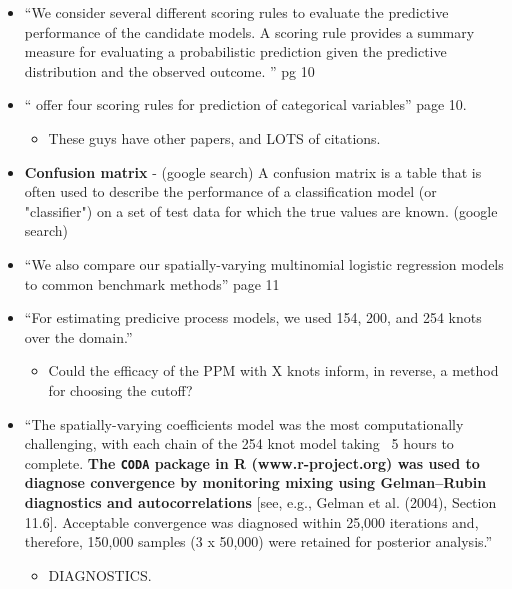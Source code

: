 \documentclass{article}
\begin{document}
\begin{itemize}
\begin{itemize}
    \end{itemize}
\item ``We consider several different scoring rules to evaluate the predictive performance of the candidate models. A scoring rule provides a summary measure for evaluating a probabilistic prediction given the predictive distribution and the observed outcome. '' pg 10
\item ``\cite{Gneiting2007} offer four scoring rules for prediction of categorical variables'' page 10. 
  \begin{itemize}
  \item These guys have other papers, and LOTS of citations.
  \end{itemize}
\item {\bf Confusion matrix} - (google search) A confusion matrix is a table that is often used to describe the performance of a classification model (or "classifier") on a set of test data for which the true values are known. (google search)
\item ``We also compare our spatially-varying multinomial logistic regression models to common benchmark methods'' page 11
\item ``For estimating predicive process models, we used 154, 200, and 254 knots over the domain.''
  \begin{itemize}
  \item Could the efficacy of the PPM with X knots inform, in reverse, a method for choosing the cutoff?
  \end{itemize}
\item ``The spatially-varying coefficients model was the most computationally challenging, with each chain of the 254 knot model taking ~5 hours to complete. {\bf The \verb|CODA| package in R (www.r-project.org) was used to diagnose convergence by monitoring mixing using Gelman–Rubin diagnostics and autocorrelations} [see, e.g., Gelman et al. (2004), Section 11.6]. Acceptable convergence was diagnosed within 25,000 iterations and, therefore, 150,000 samples (3 x 50,000) were retained for posterior analysis.''
  \begin{itemize}
  \item DIAGNOSTICS. 
  \end{itemize}
\end{itemize}
\end{document}
